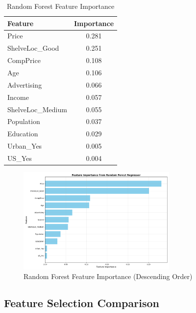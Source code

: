 \documentclass[12pt]{article}
\begin{document}
\begin{table}[H]
\centering
\caption{Random Forest Feature Importance}
\begin{tabular}{lc}
\toprule
\textbf{Feature} & \textbf{Importance} \\
\midrule
Price & 0.281 \\
ShelveLoc\_Good & 0.251 \\
CompPrice & 0.108 \\
Age & 0.106 \\
Advertising & 0.066 \\
Income & 0.057 \\
ShelveLoc\_Medium & 0.055 \\
Population & 0.037 \\
Education & 0.029 \\
Urban\_Yes & 0.005 \\
US\_Yes & 0.004 \\
\bottomrule
\end{tabular}
\end{table}

\begin{figure}[H]
    \centering
    \includegraphics[width=0.7\textwidth]{images/feature_importance.png}
    \caption{Random Forest Feature Importance (Descending Order)}
    \label{fig:rf_importance}
\end{figure}

\subsection{Feature Selection Comparison}
\end{document}
